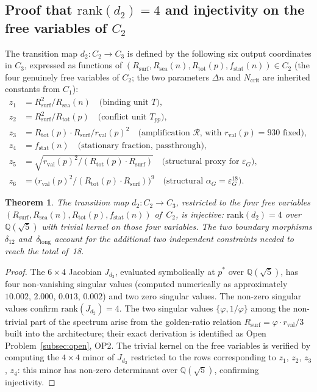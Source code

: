 \documentclass[11pt,a4paper]{article}
\newtheorem{theorem}{Theorem}[section]
\theoremstyle{definition}
\newcommand{\Rsurf}{R_{\mathrm{surf}}}
\newcommand{\Rsea}{R_{\mathrm{sea}}}
\newcommand{\Rtot}{R_{\mathrm{tot}}}
\newcommand{\rval}{r_{\mathrm{val}}}
\newcommand{\epsg}{\varepsilon_G}
\newcommand{\rank}{\mathrm{rank}}
\newcommand{\dmap}[1]{d_{#1}}
\newcommand{\dlong}{\delta_{\mathrm{long}}}
\newcommand{\calR}{\mathcal{R}}
\newcommand{\vp}{\varphi}
\begin{document}
\subsection{Proof that \texorpdfstring{$\rank(\dmap{2}) = 4$}{rank(d2) = 4} and injectivity on the free variables of \texorpdfstring{$C_2$}{C2}}
\label{subsec:rank_d2}

The transition map $\dmap{2} : C_2 \to C_3$ is defined by the following six output coordinates in $C_3$, expressed as functions of $(\Rsurf, \Rsea(n), \Rtot(p), f_{\mathrm{stat}}(n)) \in C_2$ (the four genuinely free variables of $C_2$; the two parameters $\Delta n$ and $N_{\mathrm{crit}}$ are inherited constants from $C_1$):
\begin{align*}
  z_1 &= \Rsurf^2/\Rsea(n) \quad\text{(binding unit $T$)}, \\
  z_2 &= \Rsurf^2/\Rtot(p) \quad\text{(conflict unit $T_{pp}$)}, \\
  z_3 &= \Rtot(p) \cdot \Rsurf / \rval(p)^2 \quad\text{(amplification $\calR$, with $\rval(p)=930$ fixed)}, \\
  z_4 &= f_{\mathrm{stat}}(n) \quad\text{(stationary fraction, passthrough)}, \\
  z_5 &= \sqrt{\rval(p)^2/(\Rtot(p) \cdot \Rsurf)} \quad\text{(structural proxy for $\epsg$)}, \\
  z_6 &= \bigl(\rval(p)^2/(\Rtot(p) \cdot \Rsurf)\bigr)^9 \quad\text{(structural $\alpha_G = \epsg^{18}$)}.
\end{align*}

\begin{theorem}
  \label{thm:rank_d2}
  The transition map $\dmap{2} : C_2 \to C_3$, restricted to the four free variables $(\Rsurf, \Rsea(n), \Rtot(p), f_{\mathrm{stat}}(n))$ of~$C_2$, is injective: $\rank(\dmap{2}) = 4$ over $\mathbb{Q}(\sqrt{5})$ with trivial kernel on those four variables. The two boundary morphisms $\delta_{12}$ and~$\dlong$ account for the additional two independent constraints needed to reach the total of~18.
\end{theorem}

\begin{proof}
The $6 \times 4$ Jacobian $J_{\dmap{2}}$, evaluated symbolically at $p^*$ over $\mathbb{Q}(\sqrt{5})$, has four non-vanishing singular values (computed numerically as approximately $10.002$, $2.000$, $0.013$, $0.002$) and two zero singular values. The non-zero singular values confirm $\rank(J_{\dmap{2}}) = 4$. The two singular values $\{\vp, 1/\vp\}$ among the non-trivial part of the spectrum arise from the golden-ratio relation $\Rsurf = \vp \cdot \rval/3$ built into the architecture; their exact derivation is identified as Open Problem~\ref{subsec:open}, OP2. The trivial kernel on the free variables is verified by computing the $4 \times 4$ minor of $J_{\dmap{2}}$ restricted to the rows corresponding to $z_1$, $z_2$, $z_3$, $z_4$: this minor has non-zero determinant over $\mathbb{Q}(\sqrt{5})$, confirming injectivity.
\end{proof}
\end{document}
